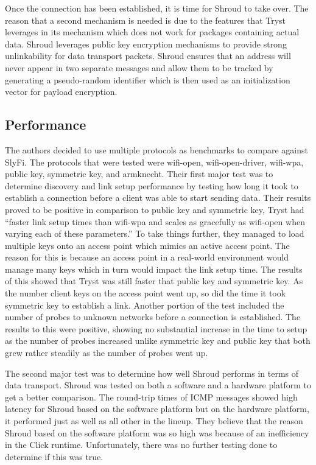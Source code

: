 \smallskip

Once the connection has been established, it is time for Shroud to take over. The reason that a second mechanism is needed is due to the features that Tryst leverages in its mechanism which does not work for packages containing actual data. Shroud leverages public key encryption mechanisms to provide strong unlinkability for data transport packets. Shroud ensures that an address will never appear in two separate messages and allow them to be tracked by generating a pseudo-random identifier which is then used as an initialization vector for payload encryption. 

\subsection {Performance} 

The authors decided to use multiple protocols as benchmarks to compare against SlyFi. The protocols that were tested were wifi-open, wifi-open-driver, wifi-wpa, public key, symmetric key, and armknecht. Their first major test was to determine discovery and link setup performance by testing how long it took to establish a connection before a client was able to start sending data. Their results proved to be positive in comparison to public key and symmetric key, Tryst had “faster link setup times than wifi-wpa and scales as gracefully as wifi-open when varying each of these parameters.” \cite {greenstein2008improving} To take things further, they managed to load multiple keys onto an access point which mimics an active access point. The reason for this is because an access point in a real-world environment would manage many keys which in turn would impact the link setup time. The results of this showed that Tryst was still faster that public key and symmetric key. As the number client keys on the access point went up, so did the time it took symmetric key to establish a link. Another portion of the test included the number of probes to unknown networks before a connection is established. The results to this were positive, showing no substantial increase in the time to setup as the number of probes increased unlike symmetric key and public key that both grew rather steadily as the number of probes went up.

\smallskip

The second major test was to determine how well Shroud performs in terms of data transport. Shroud was tested on both a software and a hardware platform to get a better comparison. The round-trip times of ICMP messages showed high latency for Shroud based on the software platform but on the hardware platform, it performed just as well as all other in the lineup. They believe that the reason Shroud based on the software platform was so high was because of an inefficiency in the Click runtime. Unfortunately, there was no further testing done to determine if this was true.

